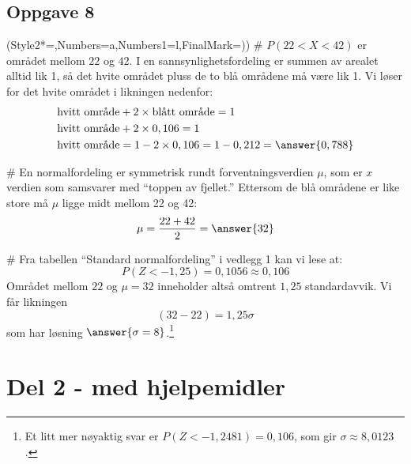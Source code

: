\subsection*{Oppgave 8}
\begin{easylist}[enumerate]
	\ListProperties(Style2*=,Numbers=a,Numbers1=l,FinalMark={)})
	# $P(22 < X < 42)$ er området mellom $22$ og $42$. I en sannsynlighetsfordeling er summen av arealet alltid lik 1, så det hvite området pluss de to blå områdene må være lik 1. Vi løser for det hvite området i likningen nedenfor:
	\begin{align*}
		\text{hvitt område} &+ 2 \times \text{blått område} = 1 \\
		\text{hvitt område} &+ 2 \times 0,106 = 1 \\
		\text{hvitt område} &= 1 - 2 \times 0,106 = 1-0,212 = \answer{0,788 }
	\end{align*}
	
	# En normalfordeling er symmetrisk rundt forventningsverdien $\mu$, som er $x$ verdien som samsvarer med ``toppen av fjellet.'' Ettersom de blå områdene er like store må $\mu$ ligge midt mellom 22 og 42:
	\begin{equation*}
		\mu = \frac{22 + 42}{2} = \answer{32}
	\end{equation*}
	
	# Fra tabellen ``Standard normalfordeling'' i vedlegg 1 kan vi lese at:
	\begin{equation*}
		P(Z < -1,25) = 0,1056 \approx 0,106
	\end{equation*}
	Området mellom $22$ og $\mu = 32$ inneholder altså omtrent $1,25$ standardavvik. Vi får likningen
	\begin{equation*}
		(32-22) = 1,25 \sigma 
	\end{equation*}
	som har løsning $\answer{\sigma = 8}$.\footnote{Et litt mer nøyaktig svar er $P(Z < -1,2481) = 0,106$, som gir $\sigma \approx 8,0123$.}
\end{easylist}




\section*{Del 2 - med hjelpemidler}

